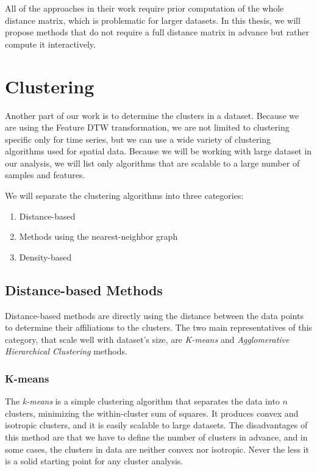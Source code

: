 All of the approaches in their work require prior computation of the whole distance matrix, which is problematic for larger datasets. In this thesis, we will propose methods that do not require a full distance matrix in advance but rather compute it interactively.

\section{Clustering}
Another part of our work is to determine the clusters in a dataset. Because we are using the Feature DTW transformation, we are not limited to clustering specific only for time series, but we can use a wide variety of clustering algorithms used for spatial data. Because we will be working with large dataset in our analysis, we will list only algorithms that are scalable to a large number of samples and features.

We will separate the clustering algorithms into three categories:
\begin{enumerate}
    \item Distance-based
    \item Methods using the nearest-neighbor graph
    \item Density-based
\end{enumerate}

\subsection{Distance-based Methods}
Distance-based methods are directly using the distance between the data points to determine their affiliations to the clusters. The two main representatives of this category, that scale well  with dataset's size, are \textit{K-means} and \textit{Agglomerative Hierarchical Clustering} methods.

\subsubsection{K-means}
The \textit{k-means} \cite{vis:kmeans} is a simple clustering algorithm that separates the data into $n$ clusters, minimizing the within-cluster sum of squares. It produces convex and isotropic clusters, and it is easily scalable to large datasets. The disadvantages of this method are that we have to define the number of clusters in advance, and in some cases, the clusters in data are neither convex nor isotropic. Never the less it is a solid starting point for any cluster analysis. 


